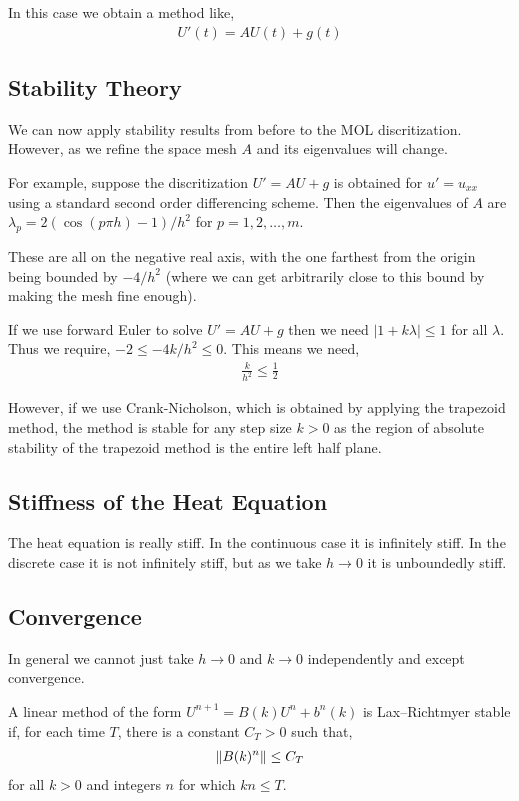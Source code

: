\documentclass[12pt]{article}
\begin{document}
In this case we obtain a method like,
\begin{align*}
    U'(t) = AU(t) + g(t)
\end{align*}

\subsection{Stability Theory}
We can now apply stability results from before to the MOL discritization. However, as we refine the space mesh \( A \) and its eigenvalues will change.

For example, suppose the discritization \( U' = AU + g \) is obtained for \( u' = u_{xx} \) using a standard second order differencing scheme. Then the eigenvalues of \( A \) are \( \lambda_p = 2(\cos(p\pi h)-1)/h^2 \) for \( p=1,2,\ldots, m \).

These are all on the negative real axis, with the one farthest from the origin being bounded by \( -4/h^2 \) (where we can get arbitrarily close to this bound by making the mesh fine enough).

If we use forward Euler to solve \( U' = AU + g \) then we need \(|1+k\lambda|\leq 1 \) for all \( \lambda \). Thus we require, \( -2\leq -4k/h^2 \leq 0 \). This means we need,
\begin{align*}
    \frac{k}{h^2} \leq \frac{1}{2}
\end{align*}

However, if we use Crank-Nicholson, which is obtained by applying the trapezoid method, the method is stable for any step size \( k > 0 \) as the region of absolute stability of the trapezoid method is the entire left half plane.

\subsection{Stiffness of the Heat Equation}
The heat equation is really stiff. In the continuous case it is infinitely stiff. In the discrete case it is not infinitely stiff, but as we take \( h\to0 \) it is unboundedly stiff. 

\subsection{Convergence}
In general we cannot just take \( h\to 0 \) and \( k\to 0 \) independently and except convergence. 

\begin{definition}
    A linear method of the form \( U^{n+1} = B(k) U^n + b^n(k) \) is Lax--Richtmyer stable if, for each time \( T \), there is a constant \( C_T > 0 \) such that,
    \begin{align*}
        \left\lVert B(k)^n\right\rVert \leq C_T
    \end{align*}
for all \( k > 0 \) and integers \( n \) for which \( kn \leq T \).
\end{definition}
\end{document}
